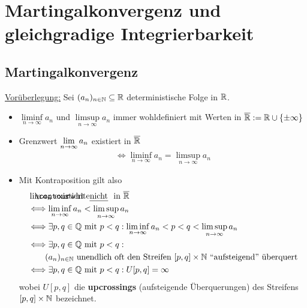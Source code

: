 
\chapter{Martingalkonvergenz und gleichgradige Integrierbarkeit} %

\section{Martingalkonvergenz}
\underline{Vorüberlegung:} Sei $(a_n)_{n\in\mathbb{N}}\subseteq\mathbb{R}$ deterministische Folge in $\mathbb{R}$.
\begin{itemize}
\item $\liminf\limits_{n\to\infty} a_n$ und $\limsup\limits_{n\to\infty} a_n$ immer wohldefiniert mit Werten in $\overline{\mathbb{R}}:=\mathbb{R}\cup\lbrace\pm\infty\rbrace$
\item Grenzwert $\lim\limits_{n\to\infty} a_n$ existiert in $\overline{\mathbb{R}}$
\begin{align*}
\Longleftrightarrow\liminf\limits_{n\to\infty} a_n=\limsup\limits_{n\to\infty} a_n
\end{align*}
\item Mit Kontraposition gilt also 
\begin{align*}
&\lim a_n\text{ existiert \ul{nicht} in }\overline{\R}\\
&\Longleftrightarrow\liminf\limits_{n\to\infty} a_n<\limsup\limits_{n\to\infty} a_n\\
&\Longleftrightarrow
\exists p,q\in\Q\mit p<q:\liminf\limits_{n\to\infty} a_n<p<q<\limsup\limits_{n\to\infty} a_n\\
&\Longleftrightarrow
\exists p,q\in\Q\mit p<q:\\
&\qquad(a_n)_{n\in\N}\text{ unendlich oft den Streifen }[p,q]\times\N\text{ ``aufsteigend'' überquert}\\
&\Longleftrightarrow
\exists p,q\in\Q\mit p<q:U[p,q]=\infty
\end{align*}
wobei $U[p,q]$ die \textbf{upcrossings} (aufsteigende Überquerungen) des Streifens $[p,q]\times\mathbb{N}$ bezeichnet.
\end{itemize}


